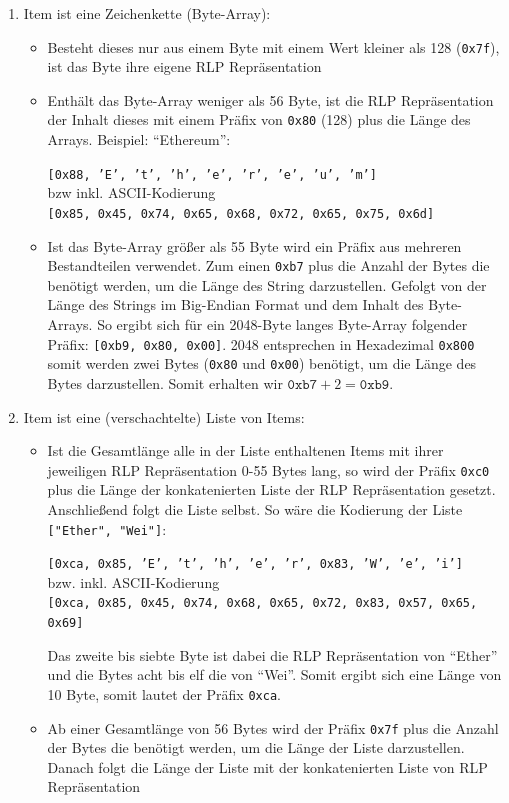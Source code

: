 \documentclass[runningheads]{llncs}
\begin{document}
\begin{enumerate}
  \item Item ist eine Zeichenkette (Byte-Array):
        \begin{itemize}
          \item Besteht dieses nur aus einem Byte mit einem Wert kleiner als 128 (\texttt{0x7f}), ist das Byte ihre eigene RLP Repräsentation
          \item Enthält das Byte-Array weniger als 56 Byte, ist die RLP Repräsentation der Inhalt dieses mit einem Präfix von \texttt{0x80} (128) plus die Länge des Arrays. Beispiel: "`Ethereum"':
          \begin{center}
            \texttt{[0x88, 'E', 't', 'h', 'e', 'r', 'e', 'u', 'm']}\\
            bzw inkl. ASCII-Kodierung\\
            \texttt{[0x85, 0x45, 0x74, 0x65, 0x68, 0x72, 0x65, 0x75, 0x6d]}
          \end{center}  
          \item Ist das Byte-Array größer als 55 Byte wird ein Präfix aus mehreren Bestandteilen verwendet. Zum einen \texttt{0xb7} plus die Anzahl der Bytes die benötigt werden, um die Länge des String darzustellen. Gefolgt von der Länge des Strings im Big-Endian Format und dem Inhalt des Byte-Arrays. So ergibt sich für ein 2048-Byte langes Byte-Array folgender Präfix: \texttt{[0xb9, 0x80, 0x00]}.
                2048 entsprechen in Hexadezimal \texttt{0x800} somit werden zwei Bytes (\texttt{0x80} und \texttt{0x00}) benötigt, um die Länge des Bytes darzustellen. Somit erhalten wir $\texttt{0xb7} + 2 = \texttt{0xb9}$.
        \end{itemize}
  \item Item ist eine (verschachtelte) Liste von Items:
        \begin{itemize}
          \item Ist die Gesamtlänge alle in der Liste enthaltenen Items mit ihrer jeweiligen RLP Repräsentation 0-55 Bytes lang, so wird der Präfix \texttt{0xc0} plus die Länge der konkatenierten Liste der RLP Repräsentation gesetzt. Anschließend folgt die Liste selbst. So wäre die Kodierung der Liste \texttt{["Ether", "Wei"]}:
          \begin{center}
            \texttt{[0xca, 0x85, 'E', 't', 'h', 'e', 'r', 0x83, 'W', 'e', 'i']}\\
            bzw. inkl. ASCII-Kodierung\\
            \texttt{[0xca, 0x85, 0x45, 0x74, 0x68, 0x65, 0x72, 0x83, 0x57, 0x65, 0x69]}
          \end{center}
          Das zweite bis siebte Byte ist dabei die RLP Repräsentation von "`Ether"' und die Bytes acht bis elf die von "`Wei"'. Somit ergibt sich eine Länge von 10 Byte, somit lautet der Präfix \texttt{0xca}.
          \item Ab einer Gesamtlänge von 56 Bytes wird der Präfix \texttt{0x7f} plus die Anzahl der Bytes die benötigt werden, um die Länge der Liste darzustellen. Danach folgt die Länge der Liste mit der konkatenierten Liste von RLP Repräsentation
        \end{itemize}
\end{enumerate}
\end{document}

